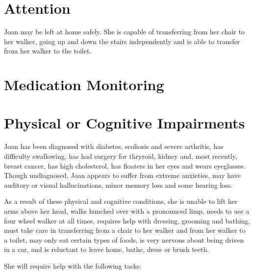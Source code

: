 \documentclass[]{article}
\begin{document}
\section*{Attention}

Joan may be left at home safely. She is capable of transferring from her chair to her walker, going up and down the stairs independently and is able to transfer from her walker to the toilet. 

\section*{Medication Monitoring}

\section*{Physical or Cognitive Impairments}

Joan has been diagnosed with diabetes, scoliosis and severe arthritis, has difficulty swallowing, has had surgery for thryroid, kidney and, most recently, breast cancer, has high cholesterol, has floaters in her eyes and wears eyeglasses. Though undiagnosed, Joan appears to suffer from extreme anxieties, may have auditory or visual hallucinations, minor memory loss and some hearing loss. 

As a result of these physical and cognitive conditions, she is unable to lift her arms above her head, walks hunched over with a pronounced limp, needs to use a four wheel walker at all times, requires help with dressing, grooming and bathing, must take care in transferring from a chair to her walker and from her walker to a toilet, may only eat certain types of foods, is very nervous about being driven in a car, and is reluctant to leave home, bathe, dress or brush teeth.

She will require help with the following tasks:
\end{document}
